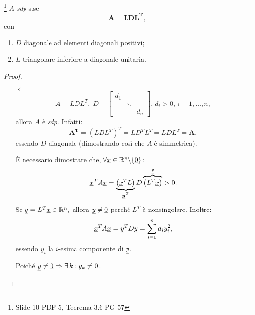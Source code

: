 \begin{theorem}\label{th:matrice_SDP_sse_LDL}\footnote{Slide 10 PDF 5, Teorema 3.6 PG 57}
    $A$ \textit{sdp} s.se \begin{equation}\label{eq:A=LDL}
        \boldsymbol{A=LDL^T},
    \end{equation} con\begin{enumerate}
        \item $D$ diagonale ad elementi diagonali positivi;
        \item $L$ triangolare inferiore a diagonale unitaria.
    \end{enumerate}
\end{theorem}
\begin{proof}
    \begin{itemize}
        \item[$\Leftarrow$]
        \begin{equation*}
            A=LDL^T,\; D=
            \begin{bmatrix}
                d_1\\
                &\ddots\\
                & & d_n
            \end{bmatrix},\, d_i>0,\, i=1,\hdots,n,
        \end{equation*}
        allora $A$ è \textit{sdp}. Infatti:
        \begin{equation*}
            \boldsymbol{A^T}=\left(LDL^T\right)^T=LD^TL^T=LDL^T=\boldsymbol A,
        \end{equation*}
        essendo $D$ diagonale (dimostrando così che $A$ è simmetrica).
        
        È necessario dimostrare che, $\forall\uline x\in\mathbb R^n\backslash\{\uline 0\}$:
        \begin{equation*}
            \uline x^T A \uline x = \underbrace{\left(\uline x^TL\right)}_{\boldsymbol{\uline y^T}}D\overbrace{\left(L^T\uline x\right)}^{\uline y}>0.
        \end{equation*}
        Se $\uline y=L^T\uline x\in\mathbb R^n,$ allora $\uline y\neq \uline 0$ perché $L^T$ è nonsingolare. Inoltre:
        \begin{equation*}
            \uline x^TA\uline x=\uline y^TD\uline y=\sum_{i=1}^n d_iy_i^2,
        \end{equation*}
        essendo $y_i$ la $i$-esima componente di $\uline y$.
        
        Poiché $\uline y\neq\uline 0\Rightarrow\exists\, k:y_k\neq 0$.
        

\end{itemize}
\end{proof}
